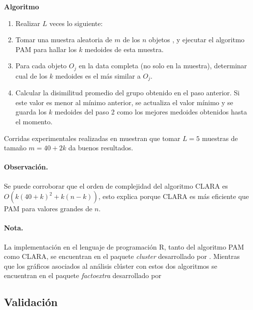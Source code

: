 \documentclass[12pt,oneside]{book}\usepackage[]{graphicx}\usepackage[]{color}
\theoremstyle{definition} %
\begin{document}
\textbf{Algoritmo}

\begin{enumerate}
\item Realizar $L$ veces lo siguiente:
\item Tomar una muestra aleatoria de $m$ de los $n$ objetos , y ejecutar el algoritmo PAM para hallar los $k$ medoides de esta muestra.
\item Para cada objeto $O_j$ en la data completa (no solo en la muestra), determinar cual de los $k$ medoides es el más similar a $O_j$.
\item Calcular la disimilitud promedio del grupo obtenido en el paso anterior. Si este valor es menor al mínimo anterior, se actualiza el valor mínimo y se guarda los $k$ medoides del paso 2 como los mejores medoides obtenidos hasta el momento.

\end{enumerate}

Corridas experimentales realizadas en \citeauthor{rousseeuw1990finding} \citeyear{rousseeuw1990finding} muestran que tomar $L=5$ muestras de tamaño $m=40 + 2k$ da buenos resultados. 

\paragraph{Observación. } Se puede corroborar que el orden de complejidad del algoritmo CLARA es $O(k(40+k)^2+k(n-k))$, esto explica porque CLARA es más eficiente que PAM para valores grandes de $n$.

\paragraph{Nota.}

La implementación en el lenguaje de programación R, tanto del algoritmo PAM como CLARA, se encuentran en el paquete \textit{cluster} desarrollado por \citeauthor{clust2019r} \citeyear{clust2019r}. Mientras que los gráficos asociados al análisis clúster con estos dos algoritmos se encuentran en el paquete \textit{factoextra} desarrollado por \citeauthor{factoext2017r} \citeyear{factoext2017r}


\subsection{Validación}
\end{document}
